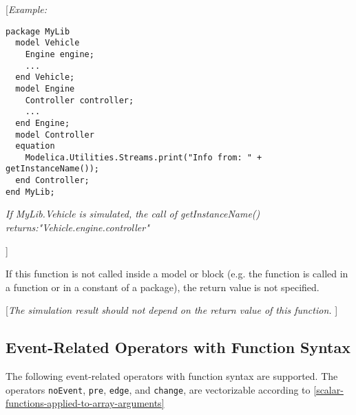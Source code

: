 {[}\emph{Example:}
\begin{lstlisting}[language=modelica]
package MyLib
  model Vehicle
    Engine engine;
    ...
  end Vehicle;
  model Engine
    Controller controller;
    ...
  end Engine;
  model Controller
  equation
    Modelica.Utilities.Streams.print("Info from: " + getInstanceName());
  end Controller;
end MyLib;
\end{lstlisting}

\emph{If MyLib.Vehicle is simulated, the call of getInstanceName()
returns:"Vehicle.engine.controller"}

{]}

If this function is not called inside a model or block (e.g. the
function is called in a function or in a constant of a package), the
return value is not specified.

{[}\emph{The simulation result should not depend on the return value of
this function.} {]}

\subsection{Event-Related Operators with Function Syntax}

The following event-related operators with function syntax are
supported. The operators \lstinline!noEvent!, \lstinline!pre!, \lstinline!edge!, and \lstinline!change!, are
vectorizable according to \autoref{scalar-functions-applied-to-array-arguments}

